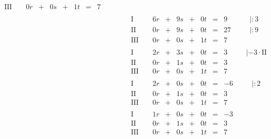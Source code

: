 \begin{exercise}
\begin{minipage}{0.49\linewidth}
\begin{align*}
\begin{array}{r|rrrrrrrrrl}
    \text{III}{\,} & {\,} & \num{0}r & + & \num{0}s & + &  \num{1}t & = &   \num{7} & {\quad} &
    \end{array}
    \\[1ex]&
    \begin{array}{r|rrrrrrrrrl}
      \text{I}{\,} & {\,} & \num{6}r & + & \num{9}s & + & \num{0}t & = &  \num{9} & {\quad} & |:\num{3} \\
     \text{II}{\,} & {\,} & \num{0}r & + & \num{9}s & + & \num{0}t & = & \num{27} & {\quad} & |:\num{9} \\
    \text{III}{\,} & {\,} & \num{0}r & + & \num{0}s & + & \num{1}t & = &  \num{7} & {\quad} &
    \end{array}
    \\[1ex]&
    \begin{array}{r|rrrrrrrrrl}
      \text{I}{\,} & {\,} & \num{2}r & + & \num{3}s & + & \num{0}t & = & \num{3} & {\quad} & |-\num{3}\cdot\text{II} \\
     \text{II}{\,} & {\,} & \num{0}r & + & \num{1}s & + & \num{0}t & = & \num{3} & {\quad} &                         \\
    \text{III}{\,} & {\,} & \num{0}r & + & \num{0}s & + & \num{1}t & = & \num{7} & {\quad} &
    \end{array}
    \\[1ex]&
    \begin{array}{r|rrrrrrrrrl}
      \text{I}{\,} & {\,} & \num{2}r & + & \num{0}s & + & \num{0}t & = & -\num{6} & {\quad} & |:\num{2} \\
     \text{II}{\,} & {\,} & \num{0}r & + & \num{1}s & + & \num{0}t & = &  \num{3} & {\quad} &           \\
    \text{III}{\,} & {\,} & \num{0}r & + & \num{0}s & + & \num{1}t & = &  \num{7} & {\quad} &
    \end{array}
    \\[1ex]&
    \begin{array}{r|rrrrrrrrrl}
      \text{I}{\,} & {\,} & \num{1}r & + & \num{0}s & + & \num{0}t & = & -\num{3} & {\quad} &   \\
     \text{II}{\,} & {\,} & \num{0}r & + & \num{1}s & + & \num{0}t & = &  \num{3} & {\quad} &   \\
    \text{III}{\,} & {\,} & \num{0}r & + & \num{0}s & + & \num{1}t & = &  \num{7} & {\quad} &
    \end{array}
    \end{align*}

\end{minipage}
\end{exercise}
